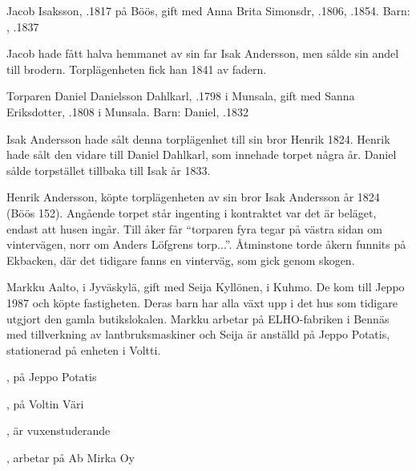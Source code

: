 %
Jacob Isaksson, .1817 på Böös, gift med Anna Brita Simonsdr, .1806, .1854.
Barn:	 , .1837

Jacob hade fått halva hemmanet av sin far Isak Andersson, men sålde sin andel till brodern. Torplägenheten fick han 1841 av fadern.


%
Torparen Daniel Danielsson Dahlkarl, .1798 i Munsala, gift med Sanna Eriksdotter, .1808 i Munsala.
Barn:	Daniel, .1832

Isak Andersson hade sålt denna torplägenhet till sin bror Henrik 1824. Henrik hade sålt den vidare till Daniel Dahlkarl, som innehade torpet några år. Daniel sålde torpstället tillbaka till Isak år 1833.


%
Henrik Andersson, köpte torplägenheten av sin bror Isak Andersson år 1824 (Böös 152). Angående torpet står ingenting i kontraktet var det är beläget, endast att husen ingår. Till åker får ``torparen fyra tegar på västra sidan om vintervägen, norr om Anders Löfgrens torp...''. Åtminstone torde åkern funnits på Ekbacken, där det tidigare fanns en 	vinterväg, som gick genom skogen.



%



%
Markku Aalto,  i Jyväskylä, gift med Seija Kyllönen,  i Kuhmo. De kom till Jeppo 1987 och köpte fastigheten. Deras barn har alla växt upp i det hus som tidigare utgjort den gamla butikslokalen. Markku arbetar på ELHO-fabriken i Bennäs med tillverkning av lantbruksmaskiner och Seija är anställd på Jeppo Potatis, stationerad på enheten i Voltti.
\begin{jhchildren}
  \item {}
  \item {}, på Jeppo Potatis
  \item {}, på Voltin Väri
  \item {}, är vuxenstuderande
  \item {}, arbetar på Ab Mirka Oy
\end{jhchildren}


